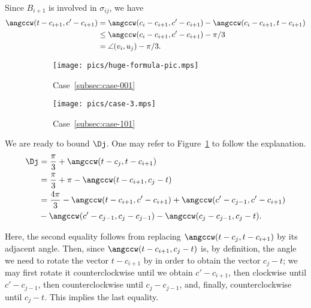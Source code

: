 \begin{enumerate}[label={\bf Case \arabic*: }, wide, labelwidth=!, labelindent=0pt]
Since $B_{i+1}$ is involved in $\sigma_{ij}$, we have
\begin{align}
\angccw(t - c_{i+1}, c' - c_{i+1}) & = \angccw(c_i - c_{i+1}, c' - c_{i+1}) - \angccw(c_i - c_{i+1}, t - c_{i+1}) \notag \\ 
& \leq \angccw(c_i - c_{i+1}, c' - c_{i+1}) - \pi / 3 \label{eqn:rotate-equilateral} \\ 
& = \angle(v_i, u_j) - \pi / 3. \notag
\end{align}

\begin{figure}[h!]
    \centering
    \begin{subfigure}[t]{.4\textwidth}
    \texttt{[image: pics/huge-formula-pic.mps]}
    \caption{Case~\ref{subsec:case-001}}
    \label{fig:huge-formula}
    \end{subfigure}
    \begin{subfigure}[t]{.4\textwidth}
    \texttt{[image: pics/case-3.mps]}
    \caption{Case~\ref{subsec:case-101}}
    \label{fig:case-1c}
    \end{subfigure}
    \caption{}
\end{figure}

We are ready to bound $\Dj$. One may refer to Figure~\ref{fig:huge-formula} to follow the explanation.
\begin{align*}
\Dj & = \frac{\pi}{3} + \angccw(t - c_j, t - c_{i+1}) \\
& = \frac{\pi}{3} + \pi - \angccw(t - c_{i+1}, c_j - t)\\
& = \frac{4\pi}{3} - \angccw(t - c_{i+1}, c' - c_{i+1}) + \angccw(c' - c_{j-1}, c' - c_{i+1}) \\ & - \angccw(c' - c_{j-1}, c_j - c_{j-1}) - \angccw(c_j - c_{j-1}, c_j - t).
\end{align*}

Here, the second equality follows from replacing $\angccw(t - c_j, t - c_{i+1})$ by its adjacent angle. Then, since $\angccw(t - c_{i+1}, c_j - t)$ is, by definition, the angle we need to rotate the vector $t - c_{i+1}$ by in order to obtain the vector $c_j - t$; we may first rotate it counterclockwise until we obtain $c' - c_{i + 1}$, then clockwise until $c' - c_{j-1}$, then counterclockwise until $c_j - c_{j-1}$, and, finally, counterclockwise until $c_j - t$. This implies the last equality.


\end{enumerate}
